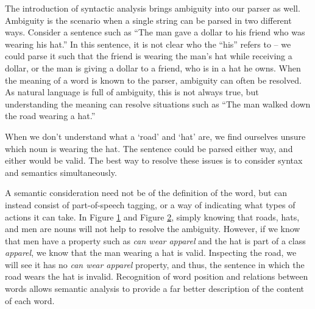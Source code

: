 The introduction of syntactic analysis brings ambiguity into our parser as well. Ambiguity is the scenario when a single string can be parsed in two different ways. Consider a sentence such as ``The man gave a dollar to his friend who was wearing his hat.'' In this sentence, it is not clear who the ``his'' refers to -- we could parse it such that the friend is wearing the man's hat while receiving a dollar, or the man is giving a dollar to a friend, who is in a hat he owns. When the meaning of a word is known to the parser, ambiguity can often be resolved. As natural language is full of ambiguity, this is not always true, but understanding the meaning can resolve situations such as ``The man walked down the road wearing a hat.''

\begin{figure}[!ht]
\centering

  \centering
  \label{fig:wrong}
\end{figure}
\begin{figure}[!ht]

  \centering
\label{fig:right}

\end{figure}

When we don't understand what a `road' and `hat' are, we find ourselves unsure which noun is wearing the hat. The sentence could be parsed either way, and either would be valid. The best way to resolve these issues is to consider syntax and semantics simultaneously.

A semantic consideration need not be of the definition of the word, but can instead consist of part-of-speech tagging, or a way of indicating what types of actions it can take. In Figure \ref{fig:wrong} and Figure \ref{fig:right}, simply knowing that roads, hats, and men are nouns will not help to resolve the ambiguity. However, if we know that men have a property such as \textit{can wear apparel} and the hat is part of a class \textit{apparel}, we know that the man wearing a hat is valid. Inspecting the road, we will see it has no \textit{can wear apparel} property, and thus, the sentence in which the road wears the hat is invalid. Recognition of word position and relations between words allows semantic analysis to provide a far better description of the content of each word.

